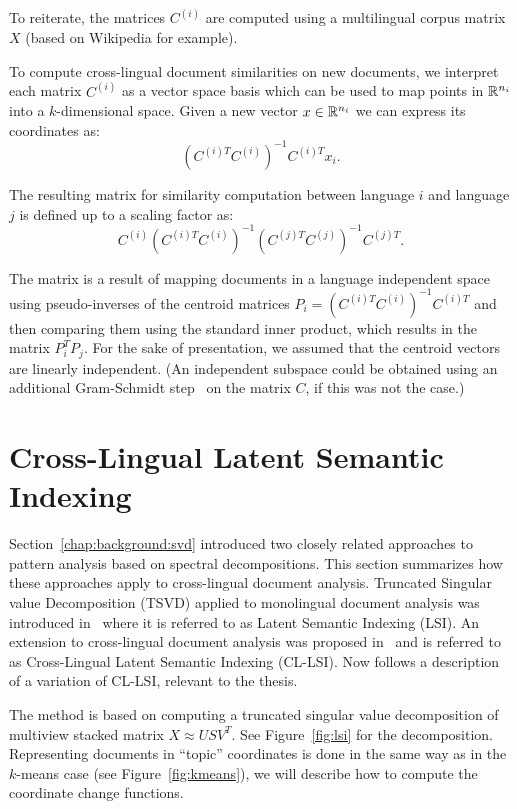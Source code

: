 To reiterate, the matrices $C^{(i)}$ are computed using a multilingual corpus
matrix $X$ (based on Wikipedia for example).

To compute  cross-lingual document similarities on new documents, we interpret each matrix $C^{(i)}$
as a vector space basis which can be used to map points in $\mathbb{R}^{n_i}$ into a $k$-dimensional space. Given
a new vector $x \in \mathbb{R}^{n_i}$ we can express its coordinates as:
$$(C^{(i)T} C^{(i)})^{-1} C^{(i)T} x_i.$$

The resulting matrix for similarity computation between language $i$ and language $j$
is defined up to a scaling factor as:
$$C^{(i)}(C^{(i)T} C^{(i)})^{-1} (C^{(j)T} C^{(j)})^{-1} C^{(j)T}.$$

The matrix is a result of mapping documents in a language independent space using
pseudo-inverses of the centroid matrices $P_i = (C^{(i)T} C^{(i)})^{-1} C^{(i)T}$ and then
comparing them using the standard inner product, which results in the matrix
$P_i^T P_j$. For the sake of presentation, we assumed that the centroid vectors
are linearly independent. (An independent subspace could be obtained using an
additional Gram-Schmidt step~\cite{golub} on the matrix $C$, if this was not the case.)

\section{Cross-Lingual Latent Semantic Indexing}\label{chap:crosslingual:LSI}

Section~\ref{chap:background:svd} introduced two closely related approaches
to pattern analysis based on spectral decompositions. This section summarizes
how these approaches apply to cross-lingual document analysis. Truncated Singular
value Decomposition (TSVD) applied to monolingual document analysis was introduced
in~\cite{lsi} where it is referred to as Latent Semantic Indexing (LSI). An extension
to cross-lingual document analysis was proposed in~\cite{cl_lsi} and is referred to as
Cross-Lingual Latent Semantic Indexing (CL-LSI). Now follows a description of a
variation of CL-LSI, relevant to the thesis.

The method is based on computing a truncated singular value decomposition of
multiview stacked matrix $X \approx U S V^T$. See Figure~\ref{fig:lsi} for the decomposition.
Representing documents in ``topic'' coordinates is done in the same way as in the $k$-means case
(see Figure~\ref{fig:kmeans}), we will describe how to compute the coordinate change functions.

